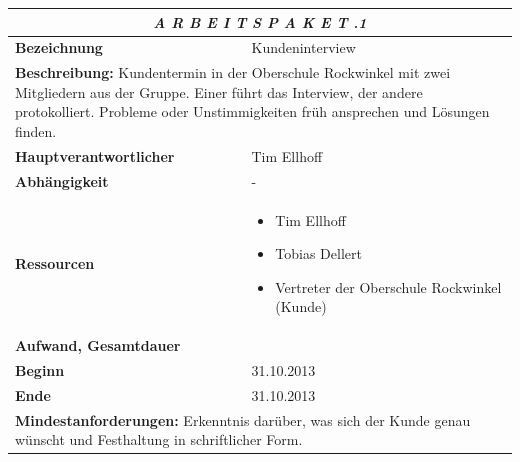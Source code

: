 \documentclass[fontsize=12pt,paper=a4,twoside]{scrartcl}
\begin{document}
\begin{tabular}{p{7.5cm}|p{7.5cm}}\toprule
\multicolumn{2}{c}{\textbf{\textit{A R B E I T S P A K E T \quad 2.1.1}}} \\ \toprule \hline
\textbf{Bezeichnung} & Kundeninterview\\\hline
\multicolumn{2}{p{15cm}}{\textbf{Beschreibung:} \newline 
Kundentermin in der Oberschule Rockwinkel mit zwei Mitgliedern aus der Gruppe. Einer führt das Interview, der andere protokolliert. Probleme oder Unstimmigkeiten früh ansprechen und Lösungen finden.}  \\\hline
\textbf{Hauptverantwortlicher} & Tim Ellhoff \\\hline
\textbf{Abhängigkeit} & -\\\hline
\textbf{Ressourcen} & \begin{itemize} 
\itemsep0pt
\item Tim Ellhoff
\item Tobias Dellert
\item Vertreter der Oberschule Rockwinkel (Kunde)
\end{itemize} \\\hline
\textbf{Aufwand, Gesamtdauer} & \\\hline
\textbf{Beginn} & 31.10.2013 \\\hline
\textbf{Ende} & 31.10.2013\\\hline
\multicolumn{2}{p{15cm}}{\textbf{Mindestanforderungen: } \newline
Erkenntnis darüber, was sich der Kunde genau wünscht und Festhaltung in schriftlicher Form. }  \\ \toprule
\end{tabular} \\\\
\end{document}
